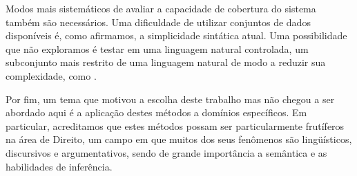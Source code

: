   Modos mais sistemáticos de avaliar a capacidade de cobertura do sistema também são necessários. Uma dificuldade de utilizar conjuntos de dados disponíveis é, como afirmamos, a simplicidade sintática atual. Uma possibilidade que não exploramos é testar em uma linguagem natural controlada, um subconjunto mais restrito de uma linguagem natural de modo a reduzir sua complexidade, como . \citep{fuchs:reasoningweb2008}
  
  Por fim, um tema que motivou a escolha deste trabalho mas não chegou a ser abordado aqui é a aplicação destes métodos a domínios específicos. Em particular, acreditamos que estes métodos possam ser particularmente frutíferos na área de Direito, um campo em que muitos dos seus fenômenos são lingüísticos, discursivos e argumentativos, sendo de grande importância a semântica e as habilidades de inferência.